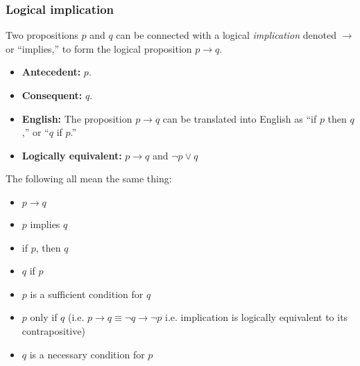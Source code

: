     \subsubsection{Logical implication}
    \begin{definition}
        Two propositions \( p \) and \( q \) can be connected with a logical \textit{implication} denoted \( \to \) or “implies,” to form the logical proposition \( p \to q \).
        \begin{itemize}
            \item \textbf{Antecedent:} \( p \).
            \item \textbf{Consequent:} \( q \). 
            \item \textbf{English:} The proposition \( p \to q \) can be translated into English as “if \( p \) then \( q \),” or “\( q \) if \( p \).” 
            \item \textbf{Logically equivalent:} $p \to q$ and $\neg p \lor q$
        \end{itemize}
    \end{definition}

    \begin{warning} The following all mean the same thing:
        \begin{itemize}
            \item $p \rightarrow q$
            \item $p$ implies $q$
            \item if $p$, then $q$
            \item $q$ if $p$
            \item $p$ is a sufficient condition for $q$
            \item $p$ only if $q$ (i.e. $p \rightarrow q \equiv \neg q \rightarrow \neg p$ i.e. implication is logically equivalent to its contrapositive)
            \item $q$ is a necessary condition for $p$
        \end{itemize}        
    \end{warning}

